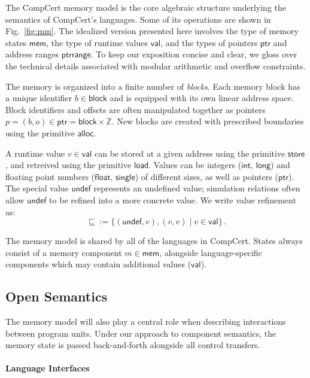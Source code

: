 \documentclass[sigplan,10pt,review,anonymous]{acmart}
\newcommand{\kw}[1]{\ensuremath{ \mathsf{#1} }}
\begin{document}
The CompCert memory model \cite{compcertmm,compcertmmv2}
is the core algebraic structure
underlying the semantics of CompCert's languages.
Some of its operations
are shown in Fig.~\ref{fig:mm}.
The idealized version presented here
involves
the type of memory states \kw{mem},
the type of runtime values \kw{val}, and
the types of pointers \kw{ptr} and address ranges \kw{ptrrange}.
To keep our exposition concise and clear,
we gloss over the technical details
associated with modular arithmetic and overflow constraints.

The memory is organized into a finite number of \emph{blocks}.
Each memory block has a unique identifier $b \in \kw{block}$
and is equipped with its own linear address space.
Block identifiers and offsets are often manipulated together
as pointers $p = (b, o) \in \kw{ptr} = \kw{block} \times \mathbb{Z}$.
New blocks are created with prescribed boundaries
using the primitive $\kw{alloc}$.

A runtime value $v \in \kw{val}$ can be stored at
a given address using the primitive \kw{store},
and retreived using the primitive \kw{load}.
Values can be integers (\kw{int}, \kw{long}) and
floating point numbers (\kw{float}, \kw{single})
of different sizes,
as well as pointers (\kw{ptr}).
The special value \kw{undef}
represents an undefined value;
simulation relations
often allow $\kw{undef}$
to be refined into a more concrete value.
We write value refinement as:
\[
    {\sqsubseteq} := \{(\kw{undef}, v), (v, v) \mid v \in \kw{val}\} \,.
\]

The memory model is shared by all of the languages in CompCert.
States always consist of
a memory component $m \in \kw{mem}$,
alongside language-specific components
which may contain additional values ($\kw{val}$).


\subsection{Open Semantics} \label{sec:sem:open} %

The memory model will also play a central role
when describing interactions between program units.
Under our approach to component semantics,
the memory state is passed back-and-forth
alongside all control transfers.

\paragraph{Language Interfaces} %
\end{document}

